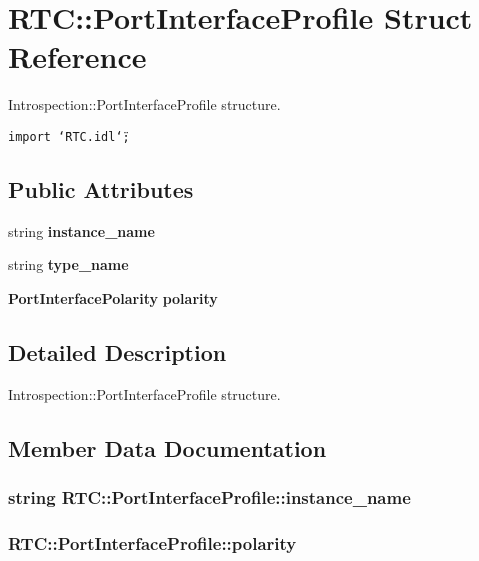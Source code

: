 \section{RTC::Port\-Interface\-Profile Struct Reference}
\label{structRTC_1_1PortInterfaceProfile}
Introspection::Port\-Interface\-Profile structure.  


{\tt import \char`\"{}RTC.idl\char`\"{};}

\subsection*{Public Attributes}
\begin{CompactItemize}
\item 
string {\bf instance\_\-name}
\item 
string {\bf type\_\-name}
\item 
{\bf Port\-Interface\-Polarity} {\bf polarity}
\end{CompactItemize}


\subsection{Detailed Description}
Introspection::Port\-Interface\-Profile structure. 



\subsection{Member Data Documentation}
\subsubsection{\setlength{\rightskip}{0pt plus 5cm}string {\bf RTC::Port\-Interface\-Profile::instance\_\-name}}\label{structRTC_1_1PortInterfaceProfile_RTC_1_1PortInterfaceProfileo0}


\subsubsection{ {\bf RTC::Port\-Interface\-Profile::polarity}}\label{structRTC_1_1PortInterfaceProfile_RTC_1_1PortInterfaceProfileo2}


